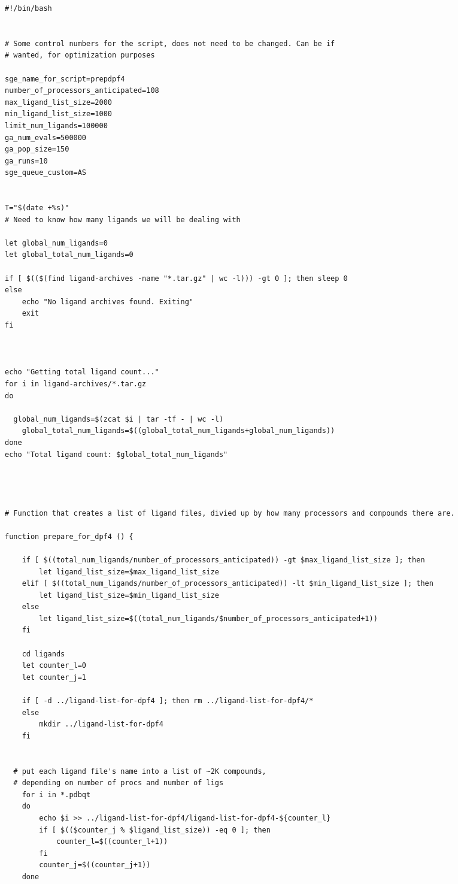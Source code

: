 \begin{changemargin}{-0.5in}{0in}

\begin{lstlisting}
#!/bin/bash


# Some control numbers for the script, does not need to be changed. Can be if 
# wanted, for optimization purposes

sge_name_for_script=prepdpf4
number_of_processors_anticipated=108
max_ligand_list_size=2000
min_ligand_list_size=1000
limit_num_ligands=100000
ga_num_evals=500000
ga_pop_size=150
ga_runs=10
sge_queue_custom=AS


T="$(date +%s)"
# Need to know how many ligands we will be dealing with

let global_num_ligands=0
let global_total_num_ligands=0

if [ $(($(find ligand-archives -name "*.tar.gz" | wc -l))) -gt 0 ]; then sleep 0
else 
	echo "No ligand archives found. Exiting"
	exit
fi



echo "Getting total ligand count..."
for i in ligand-archives/*.tar.gz
do
  
  global_num_ligands=$(zcat $i | tar -tf - | wc -l)
	global_total_num_ligands=$((global_total_num_ligands+global_num_ligands))
done
echo "Total ligand count: $global_total_num_ligands"




# Function that creates a list of ligand files, divied up by how many processors and compounds there are. 

function prepare_for_dpf4 () {

	if [ $((total_num_ligands/number_of_processors_anticipated)) -gt $max_ligand_list_size ]; then
		let ligand_list_size=$max_ligand_list_size
	elif [ $((total_num_ligands/number_of_processors_anticipated)) -lt $min_ligand_list_size ]; then
		let ligand_list_size=$min_ligand_list_size
	else
		let ligand_list_size=$((total_num_ligands/$number_of_processors_anticipated+1))
	fi

	cd ligands
	let counter_l=0
	let counter_j=1

	if [ -d ../ligand-list-for-dpf4 ]; then rm ../ligand-list-for-dpf4/*
	else
		mkdir ../ligand-list-for-dpf4
	fi


  # put each ligand file's name into a list of ~2K compounds,
  # depending on number of procs and number of ligs
	for i in *.pdbqt
	do
		echo $i >> ../ligand-list-for-dpf4/ligand-list-for-dpf4-${counter_l}
		if [ $(($counter_j % $ligand_list_size)) -eq 0 ]; then
			counter_l=$((counter_l+1))
		fi
		counter_j=$((counter_j+1))
	done
	

\end{lstlisting}
\end{changemargin}
